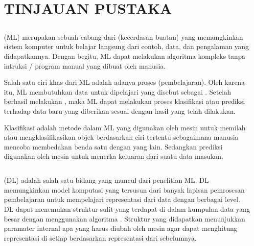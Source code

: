 \chapter{TINJAUAN PUSTAKA}


\section{}


 (ML) merupakan sebuah cabang dari  (kecerdasan buatan) yang memungkinkan sistem
komputer untuk belajar langsung dari contoh, data, dan pengalaman yang didapatkannya. Dengan begitu, ML dapat melakukan algoritma kompleks tanpa intruksi / program manual yang dibuat oleh manusia.

Salah satu ciri khas dari ML adalah adanya proses  (pembelajaran). Oleh karena itu, ML membutuhkan data untuk dipelajari yang disebut sebagai . Setelah berhasil melakukan , maka ML dapat melakukan proses klasifikasi atau prediksi terhadap data baru yang diberikan sesuai dengan hasil  yang telah dilakukan.

Klasifikasi adalah metode dalam ML yang digunakan oleh mesin untuk memilah atau mengklasifikasikan objek berdasarkan ciri tertentu sebagaimana manusia mencoba membedakan benda satu dengan yang lain\citep{shalev-shwartz_ben-david_2014}. Sedangkan prediksi digunakan oleh mesin untuk menerka keluaran dari suatu data masukan. 

\section{}
 (DL) adalah salah satu bidang yang muncul dari penelitian ML.
DL memungkinkan model komputasi yang tersusun dari banyak lapisan pemrosesan pembelajaran untuk mempelajari representasi dari data dengan berbagai level.
DL dapat menemukan struktur sulit yang terdapat di dalam kumpulan data yang besar dengan menggunakan algoritma  \citep{DBLP:journals/corr/ZhangBHRV16}.
Struktur yang didapatkan menunjukkan paramater internal apa yang harus diubah oleh mesin agar dapat menghitung representasi di setiap  berdasarkan representasi dari  sebelumnya.


